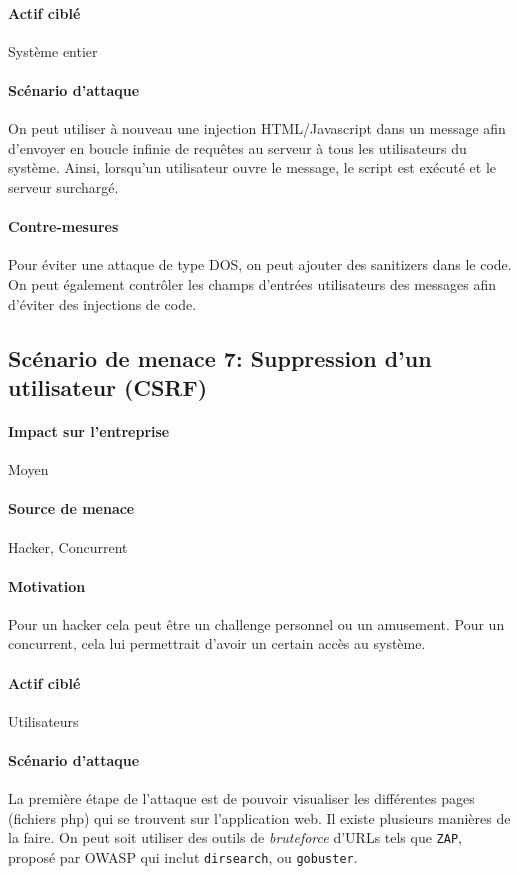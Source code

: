 \documentclass[a4paper,10pt]{article}
\begin{document}
        \paragraph{Actif ciblé} Système entier
        \paragraph{Scénario d'attaque} On peut utiliser à nouveau une injection HTML/Javascript dans un message afin d'envoyer en boucle infinie de requêtes au serveur à tous les utilisateurs du système. Ainsi, lorsqu'un utilisateur ouvre le message, le script est exécuté et le serveur surchargé.
        \paragraph{Contre-mesures} Pour éviter une attaque de type DOS, on peut ajouter des sanitizers dans le code. On peut également contrôler les champs d'entrées utilisateurs des messages afin d'éviter des injections de code.
    \subsection*{Scénario de menace 7: Suppression d'un utilisateur (CSRF)}
        \paragraph{Impact sur l'entreprise} Moyen
        \paragraph{Source de menace} Hacker, Concurrent
        \paragraph{Motivation} Pour un hacker cela peut être un challenge personnel ou un amusement. Pour un concurrent, cela lui permettrait d'avoir un certain accès au système.
        \paragraph{Actif ciblé} Utilisateurs
        \paragraph{Scénario d'attaque} La première étape de l'attaque est de pouvoir visualiser les différentes pages (fichiers php) qui se trouvent sur l'application web. Il existe plusieurs manières de la faire. On peut soit utiliser des outils de \textit{bruteforce} d'URLs tels que \verb|ZAP|, proposé par OWASP qui inclut \verb|dirsearch|, ou \verb|gobuster|. \\ 
        
\end{document}
